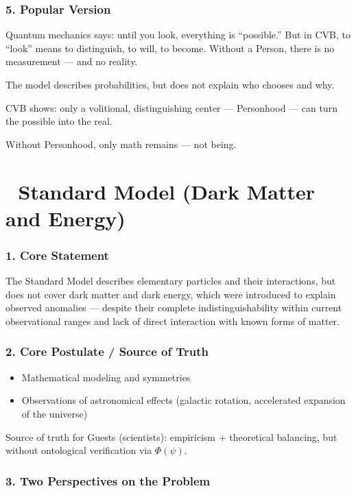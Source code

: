 \documentclass[12pt]{article}
\begin{document}
\subsubsection*{5. Popular Version}

Quantum mechanics says: until you look, everything is ``possible.'' But in CVB, to ``look'' means to distinguish, to will, to become. Without a Person, there is no measurement — and no reality.

The model describes probabilities, but does not explain who chooses and why.

CVB shows: only a volitional, distinguishing center — Personhood — can turn the possible into the real.

Without Personhood, only math remains — not being.

\section*{🔷 Standard Model (Dark Matter and Energy)}

\subsubsection*{1. Core Statement}

The Standard Model describes elementary particles and their interactions, but does not cover dark matter and dark energy, which were introduced to explain observed anomalies — despite their complete indistinguishability within current observational ranges and lack of direct interaction with known forms of matter.

\subsubsection*{2. Core Postulate / Source of Truth}

\begin{itemize}
\item Mathematical modeling and symmetries
\item Observations of astronomical effects (galactic rotation, accelerated expansion of the universe)
\end{itemize}

Source of truth for Guests (scientists): empiricism + theoretical balancing, but without ontological verification via $\Phi(\psi)$.

\subsubsection*{3. Two Perspectives on the Problem}
\end{document}
